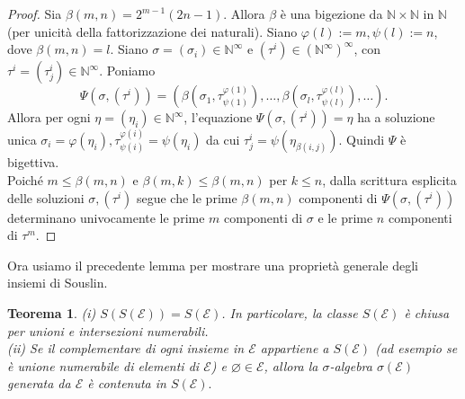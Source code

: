 \documentclass[a4paper, twoside,openright]{article}
\newcommand{\<}{\langle}
\renewcommand{\>}{\rangle}
\newtheorem{teo}{Teorema}[]
\begin{document}
\begin{proof}
	Sia $\beta(m, n)=2^{m-1}(2 n-1)$. Allora $\beta$ è una bigezione da $\mathbb{N} \times \mathbb{N}$ in $\mathbb{N}$ (per unicità della fattorizzazione dei naturali). Siano $\varphi(l):=m, \psi(l):=n$, dove $\beta(m, n)=l$. Siano $\sigma=\left(\sigma_{i}\right) \in \mathbb{N}^{\infty}$ e $\left(\tau^{i}\right) \in\left(\mathbb{N}^{\infty}\right)^{\infty}$, con $\tau^{i}=\left(\tau_{j}^{i}\right) \in \mathbb{N}^{\infty}$. Poniamo
	$$
	\Psi\left(\sigma,\left(\tau^{i}\right)\right)=\left(\beta\left(\sigma_{1}, \tau_{\psi(1)}^{\varphi(1)}\right), \ldots, \beta\left(\sigma_{l}, \tau_{\psi(l)}^{\varphi(l)}\right), \ldots\right) .
	$$
	Allora per ogni $\eta=\left(\eta_{i}\right) \in \mathbb{N}^{\infty}$, l'equazione $\Psi\left(\sigma,\left(\tau^{i}\right)\right)=\eta$ ha a soluzione unica $\sigma_{i}=\varphi\left(\eta_{i}\right),  \tau_{\psi(i)}^{\varphi(i)}=\psi(\eta_i)$ da cui $\tau_{j}^{i}=\psi\left(\eta_{\beta(i, j)}\right)$. Quindi $\Psi$ è bigettiva.\\
	Poiché $m \leq \beta(m, n)$ e $\beta(m, k) \leq \beta(m, n)$ per $k \leq n$, dalla scrittura esplicita delle soluzioni $\sigma, (\tau^i)$ segue che le prime $\beta(m, n)$ componenti di $\Psi\left(\sigma,\left(\tau^{i}\right)\right)$ determinano univocamente le prime $m$ componenti di $\sigma$ e le prime $n$ componenti di $\tau^{m}$.
	
\end{proof}

Ora usiamo il precedente lemma per mostrare una proprietà generale degli insiemi di Souslin.\\

\begin{teo}
	(i) $S(S(\mathcal{E}))=S(\mathcal{E})$. In particolare, la classe $S(\mathcal{E})$ è chiusa per unioni e intersezioni numerabili.\\
	(ii) Se il complementare di ogni insieme in $\mathcal{E}$ appartiene a $S(\mathcal{E})$ (ad esempio se è unione numerabile di elementi di $\mathcal{E}$) e $\varnothing \in \mathcal{E}$, allora la $\sigma$-algebra $\sigma(\mathcal{E})$ generata da $\mathcal{E}$ è contenuta in $S(\mathcal{E}).$
\end{teo}
\end{document}
